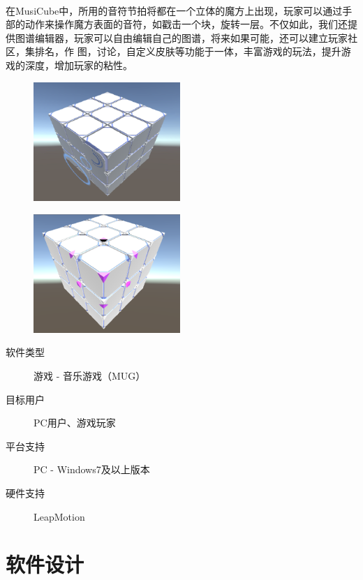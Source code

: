 \documentclass{article}
\begin{document}
\paragraph{}
在MusiCube中，所用的音符节拍将都在一个立体的魔方上出现，玩家可以通过手部的动作来操作魔方表面的音符，如戳击一个块，旋转一层。不仅如此，我们还提供图谱编辑器，玩家可以自由编辑自己的图谱，将来如果可能，还可以建立玩家社区，集排名，作
图，讨论，自定义皮肤等功能于一体，丰富游戏的玩法，提升游戏的深度，增加玩家的粘性。
\begin{figure}[H]
  \begin{minipage}{0.5\linewidth}
    \includegraphics[width=15em]{mid-demo1.png}\\
    \caption{}\label{demo1}
  \end{minipage}
  \begin{minipage}{0.5\linewidth}
    \includegraphics[width=15em]{mid-demo2.png}\\
    \caption{}\label{demo2}
  \end{minipage}
\end{figure}
\begin{description}
  \item[软件类型] 游戏 - 音乐游戏（MUG）
  \item[目标用户] PC用户、游戏玩家
  \item[平台支持] PC - Windows7及以上版本
  \item[硬件支持] LeapMotion
\end{description}
\newpage
\section{软件设计}
\end{document}
